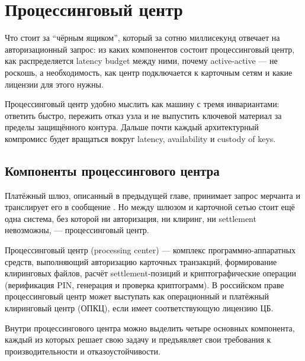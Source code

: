 \chapter{Процессинговый центр}
\label{ch:processing-center}
\margintoc


\begin{kaobox}[title=Что вы узнаете из этой главы]
  Что стоит за \enquote{чёрным ящиком}, который за сотню
  миллисекунд отвечает на авторизационный запрос: из каких
  компонентов состоит процессинговый центр, как распределяется
  latency budget между ними, почему active-active — не роскошь,
  а необходимость, как центр подключается к карточным сетям
  и какие лицензии для этого нужны.
\end{kaobox}

Процессинговый центр удобно мыслить как машину с тремя
инвариантами: ответить быстро, пережить отказ узла и не выпустить
ключевой материал за пределы защищённого контура. Дальше почти
каждый архитектурный компромисс будет вращаться вокруг latency,
availability и custody of keys.

\section{Компоненты процессингового центра}
\label{sec:pc-components}

Платёжный шлюз, описанный в предыдущей главе, принимает запрос
мерчанта и транслирует его в сообщение . Но между
шлюзом и карточной сетью стоит ещё одна система, без которой
ни авторизация, ни клиринг, ни settlement невозможны, —
процессинговый центр.

\begin{kaobox}[title={Определение: Процессинговый центр}, colback=blue!4, colbacktitle=blue!15]
  Процессинговый центр (processing center) — комплекс
  программно-аппаратных средств, выполняющий авторизацию
  карточных транзакций, формирование клиринговых файлов,
  расчёт settlement-позиций и криптографические операции
  (верификация PIN, генерация и проверка криптограмм).
  В российском праве процессинговый центр может выступать
  как операционный и платёжный клиринговый центр (ОПКЦ),
  если имеет соответствующую лицензию ЦБ.
\end{kaobox}

Внутри процессингового центра можно выделить четыре основных
компонента, каждый из которых решает свою задачу и предъявляет
свои требования к производительности и отказоустойчивости.

